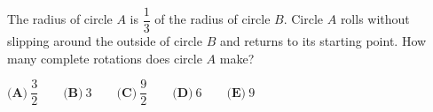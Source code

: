 The radius of circle $A$ is $\dfrac13$ of the radius of circle $B$. Circle $A$ rolls without slipping around the outside of circle $B$ and returns to its starting point. How many complete rotations does circle $A$ make?

$\textbf{(A)}\ \dfrac32\qquad\textbf{(B)}\ 3\qquad\textbf{(C)}\ \dfrac92\qquad\textbf{(D)}\ 6\qquad\textbf{(E)}\ 9$
